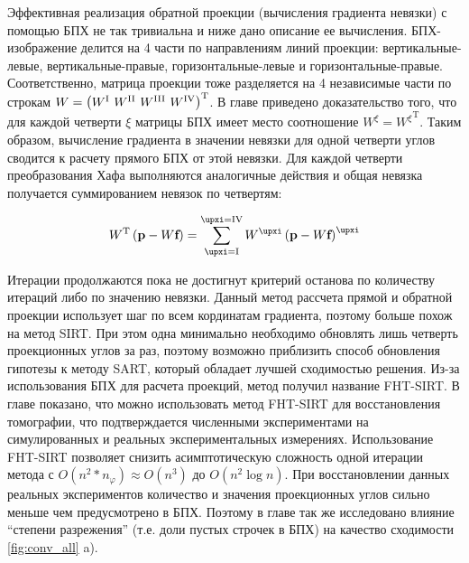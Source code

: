 Эффективная реализация обратной проекции (вычисления градиента невязки) с помощью БПХ не так тривиальна и ниже дано описание ее вычисления.
БПХ-изображение делится на 4 части по направлениям линий проекции: вертикальные-левые, вертикальные-правые, горизонтальные-левые и горизонтальные-правые.
Соответственно, матрица проекции тоже разделяется на 4 независимые части по строкам $W = \left( W^\rom{1}\ W^\rom{2}\ W^\rom{3}\ W^\rom{4} \right)^{\mathrm T}$.
В главе приведено доказательство того, что для каждой четверти $\xi$ матрицы БПХ имеет место соотношение $W^\xi = {W^\xi}^{\mathrm T}$.
Таким образом, вычисление градиента в значении невязки для одной четверти углов сводится к расчету прямого БПХ от этой невязки.  
Для каждой четверти преобразования Хафа выполняются аналогичные действия и общая невязка получается суммированием невязок по четвертям:

\begin{equation} \notag
W^{\mathrm T}\left( \textbf p - W \textbf f\right) = \sum_{\xi = \rom{1}} ^{\xi = \rom{4}} {W^{\xi} \left(\textbf p - W \textbf f \right)^{\xi}}
\end{equation}

Итерации продолжаются пока не достигнут критерий останова по количеству итераций либо по значению невязки.
Данный метод рассчета прямой и обратной проекции использует шаг по всем кординатам градиента, поэтому больше похож на метод SIRT.
При этом одна минимально необходимо обновлять лишь четверть проекционных углов за раз, поэтому возможно приблизить способ обновления гипотезы к методу SART, который обладает лучшей сходимостью решения.
Из-за использования БПХ для расчета проекций, метод получил название FHT-SIRT.
В главе показано, что можно использовать метод FHT-SIRT для восстановления томографии, что подтверждается численными экспериментами на симулированных и реальных экспериментальных измерениях.
Использование FHT-SIRT позволяет снизить асимптотическую сложность одной итерации метода с $O(n^2 * n_\varphi) \approx O(n^3)$ до $O(n^2 \log n)$.
При восстановлении данных реальных экспериментов количество и значения проекционных углов сильно меньше чем предусмотрено в БПХ. 
Поэтому в главе так же исследовано влияние ``степени разрежения'' (т.е. доли пустых строчек в БПХ) на качество сходимости \ref{fig:conv_all} a).

